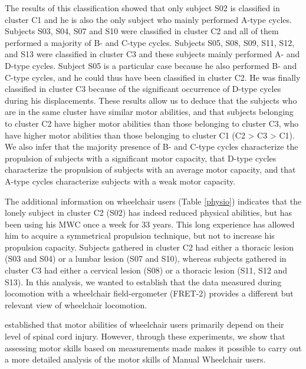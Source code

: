 The results of this  classification showed that only subject S02 is classified in cluster C1  and he is also the only subject who mainly performed A-type cycles. Subjects S03, S04, S07 and S10 were classified in cluster C2  and all of them performed a majority of B- and C-type cycles. Subjects S05, S08, S09, S11, S12, and S13 were classified in cluster C3 and these subjects mainly performed A- and D-type cycles. Subject S05 is a particular case because he also performed B- and C-type cycles, and he could thus have been classified in cluster C2. He was finally classified in cluster C3 because of the significant occurrence of D-type cycles during his displacements. These results allow us to deduce that the subjects who are in the same cluster have similar motor abilities, and that subjects belonging to cluster C2 have higher motor abilities than those belonging to cluster C3, who have higher motor abilities than those belonging to cluster C1 (C2 > C3 > C1). We also infer that the majority presence of B- and C-type cycles characterize the propulsion of subjects with a significant motor capacity, that D-type cycles characterize the propulsion of subjects with an average motor capacity, and that A-type cycles characterize subjects with a weak motor capacity.



The additional information on wheelchair users (Table \ref{physio}) indicates that the lonely subject in cluster C2 (S02) has indeed reduced physical abilities, but has been using his MWC once a week for 33 years. This long experience has allowed him to acquire a symmetrical propulsion technique, but not to increase his propulsion capacity. Subjects gathered in cluster C2  had either a thoracic lesion (S03 and S04) or a lumbar lesion (S07 and S10), whereas subjects gathered in cluster C3 had either a cervical lesion (S08) or a thoracic lesion (S11, S12 and S13).
In this analysis, we wanted to establish that the data measured during locomotion with a wheelchair field-ergometer (FRET-2) provides a different but relevant view of wheelchair locomotion. 


\cite{athanasiou2009bayesian} established that motor abilities of wheelchair users primarily depend on their level of spinal cord injury. However, through these experiments, we show that assessing motor skills based on measurements made makes it possible to carry out a more detailed analysis of the motor skills of Manual Wheelchair users.


